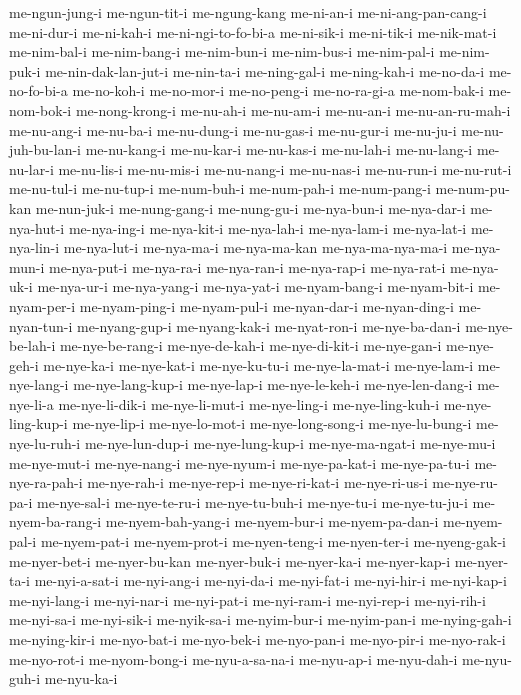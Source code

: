 {me-ngun-jung-i me-ngun-tit-i me-ngung-kang me-ni-an-i me-ni-ang-pan-cang-i
me-ni-dur-i me-ni-kah-i me-ni-ngi-to-fo-bi-a me-ni-sik-i me-ni-tik-i
me-nik-mat-i me-nim-bal-i me-nim-bang-i me-nim-bun-i me-nim-bus-i
me-nim-pal-i me-nim-puk-i me-nin-dak-lan-jut-i me-nin-ta-i me-ning-gal-i
me-ning-kah-i me-no-da-i me-no-fo-bi-a me-no-koh-i me-no-mor-i
me-no-peng-i me-no-ra-gi-a me-nom-bak-i me-nom-bok-i me-nong-krong-i
me-nu-ah-i me-nu-am-i me-nu-an-i me-nu-an-ru-mah-i me-nu-ang-i me-nu-ba-i
me-nu-dung-i me-nu-gas-i me-nu-gur-i me-nu-ju-i me-nu-juh-bu-lan-i
me-nu-kang-i me-nu-kar-i me-nu-kas-i me-nu-lah-i me-nu-lang-i me-nu-lar-i
me-nu-lis-i me-nu-mis-i me-nu-nang-i me-nu-nas-i me-nu-run-i me-nu-rut-i
me-nu-tul-i me-nu-tup-i me-num-buh-i me-num-pah-i me-num-pang-i
me-num-pu-kan me-nun-juk-i me-nung-gang-i me-nung-gu-i me-nya-bun-i
me-nya-dar-i me-nya-hut-i me-nya-ing-i me-nya-kit-i me-nya-lah-i
me-nya-lam-i me-nya-lat-i me-nya-lin-i me-nya-lut-i me-nya-ma-i
me-nya-ma-kan me-nya-ma-nya-ma-i me-nya-mun-i me-nya-put-i me-nya-ra-i
me-nya-ran-i me-nya-rap-i me-nya-rat-i me-nya-uk-i me-nya-ur-i
me-nya-yang-i me-nya-yat-i me-nyam-bang-i me-nyam-bit-i me-nyam-per-i
me-nyam-ping-i me-nyam-pul-i me-nyan-dar-i me-nyan-ding-i me-nyan-tun-i
me-nyang-gup-i me-nyang-kak-i me-nyat-ron-i me-nye-ba-dan-i
me-nye-be-lah-i me-nye-be-rang-i me-nye-de-kah-i me-nye-di-kit-i
me-nye-gan-i me-nye-geh-i me-nye-ka-i me-nye-kat-i me-nye-ku-tu-i
me-nye-la-mat-i me-nye-lam-i me-nye-lang-i me-nye-lang-kup-i me-nye-lap-i
me-nye-le-keh-i me-nye-len-dang-i me-nye-li-a me-nye-li-dik-i
me-nye-li-mut-i me-nye-ling-i me-nye-ling-kuh-i me-nye-ling-kup-i
me-nye-lip-i me-nye-lo-mot-i me-nye-long-song-i me-nye-lu-bung-i
me-nye-lu-ruh-i me-nye-lun-dup-i me-nye-lung-kup-i me-nye-ma-ngat-i
me-nye-mu-i me-nye-mut-i me-nye-nang-i me-nye-nyum-i me-nye-pa-kat-i
me-nye-pa-tu-i me-nye-ra-pah-i me-nye-rah-i me-nye-rep-i me-nye-ri-kat-i
me-nye-ri-us-i me-nye-ru-pa-i me-nye-sal-i me-nye-te-ru-i me-nye-tu-buh-i
me-nye-tu-i me-nye-tu-ju-i me-nyem-ba-rang-i me-nyem-bah-yang-i
me-nyem-bur-i me-nyem-pa-dan-i me-nyem-pal-i me-nyem-pat-i me-nyem-prot-i
me-nyen-teng-i me-nyen-ter-i me-nyeng-gak-i me-nyer-bet-i me-nyer-bu-kan
me-nyer-buk-i me-nyer-ka-i me-nyer-kap-i me-nyer-ta-i me-nyi-a-sat-i
me-nyi-ang-i me-nyi-da-i me-nyi-fat-i me-nyi-hir-i me-nyi-kap-i
me-nyi-lang-i me-nyi-nar-i me-nyi-pat-i me-nyi-ram-i me-nyi-rep-i
me-nyi-rih-i me-nyi-sa-i me-nyi-sik-i me-nyik-sa-i me-nyim-bur-i
me-nyim-pan-i me-nying-gah-i me-nying-kir-i me-nyo-bat-i me-nyo-bek-i
me-nyo-pan-i me-nyo-pir-i me-nyo-rak-i me-nyo-rot-i me-nyom-bong-i
me-nyu-a-sa-na-i me-nyu-ap-i me-nyu-dah-i me-nyu-guh-i me-nyu-ka-i
}
